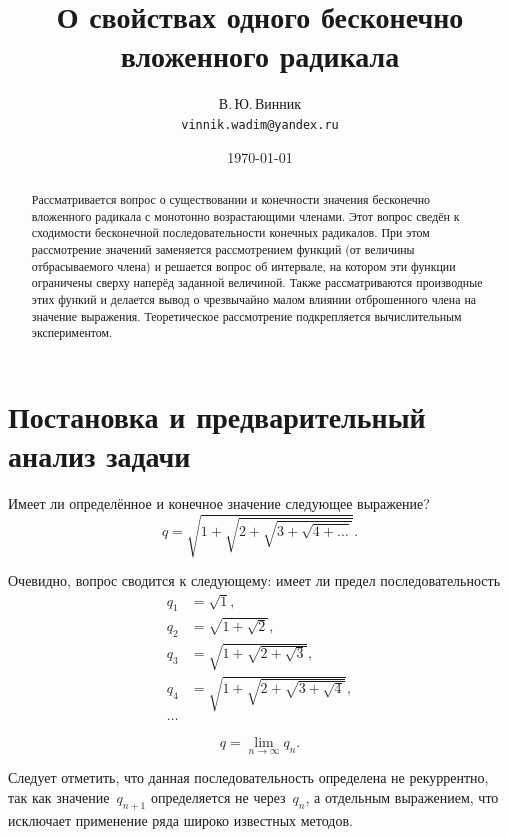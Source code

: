 \documentclass[12pt]{article}
\title{О свойствах одного бесконечно вложенного радикала}
\author{В.\,Ю.\,Винник\\ \texttt{vinnik.wadim@yandex.ru}}
\date{\today}
\begin{document}
\maketitle

\begin{abstract}
Рассматривается вопрос о существовании и конечности значения бесконечно вложенного радикала с монотонно возрастающими членами. Этот вопрос сведён к сходимости
бесконечной последовательности конечных радикалов.  При этом рассмотрение значений заменяется рассмотрением функций (от величины отбрасываемого члена) и
решается вопрос об интервале, на котором эти функции ограничены сверху наперёд заданной величиной.  Также рассматриваются производные этих функий и делается
вывод о чрезвычайно малом влиянии отброшенного члена на значение выражения. Теоретическое рассмотрение подкрепляется вычислительным экспериментом.
\end{abstract}

\section{Постановка и предварительный анализ задачи}

Имеет ли определённое и конечное значение следующее выражение?
\begin{equation} \label{eq:initial}
q = \sqrt{1 + \sqrt{2 + \sqrt{3 + \sqrt{4 +\ldots}}}} .
\end{equation}

Очевидно, вопрос сводится к следующему: имеет ли предел последовательность
\begin{equation} \label{eq:val_seq}
\begin{aligned}
    q_1 & = \sqrt{1}, \\
    q_2 & = \sqrt{1 + \sqrt{2}}, \\
    q_3 & = \sqrt{1 + \sqrt{2 + \sqrt{3}}}, \\
    q_4 & = \sqrt{1 + \sqrt{2 + \sqrt{3 + \sqrt{4}}}}, \\
    \ldots
\end{aligned}
\end{equation}

\begin{equation} \label{eq:lim}
    q = \lim_{n \to \infty} {q_n} .
\end{equation}

Следует отметить, что данная последовательность определена не рекуррентно, так как значение~\(q_{n+1}\) определяется не через~\(q_n\), а отдельным выражением,
что исключает применение ряда широко известных методов.
\end{document}
